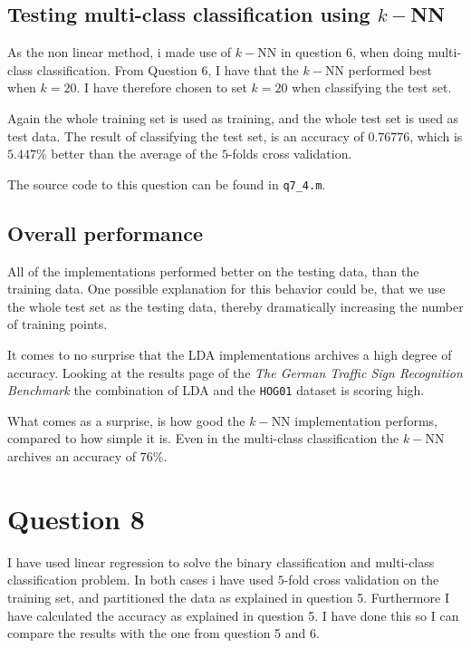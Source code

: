 \documentclass[10pt]{article}
\begin{document}

\subsection*{Testing multi-class classification using $k-$NN} %
\label{sub:testing_multi_class_classification_using_knn}
As the non linear method, i made use of $k-$NN in question 6, when doing multi-class classification. From Question 6, I have that the $k-$NN performed best when $k=20$. I have therefore chosen to set $k=20$ when classifying the test set. 

Again the whole training set is used as training, and the whole test set is used as test data. The result of classifying the test set, is an accuracy of $0.76776$, which is $5.447\%$ better than the average of the $5$-folds cross validation.  

The source code to this question can be found in \texttt{q7\_4.m}.

\subsection*{Overall performance} %
\label{sub:overall_performance}

All of the implementations performed better on the testing data, than the training data. One possible explanation for this behavior could be, that we use the whole test set as the testing data, thereby dramatically increasing the number of training points.

It comes to no surprise that the LDA implementations archives a high degree of accuracy. Looking at the results page of the \emph{The German Traffic Sign Recognition Benchmark}\cite{resultsURL} the combination of LDA and the \texttt{HOG01} dataset is scoring high.

What comes as a surprise, is how good the $k-$NN implementation performs, compared to how simple it is. Even in the multi-class classification the $k-$NN archives an accuracy of $76\%$.


\section*{Question 8} %
\label{sec:question_8}

I have used linear regression to solve the binary classification and multi-class classification problem. In both cases i have used $5$-fold cross validation on the training set, and partitioned the data as explained in question 5. Furthermore I have calculated the accuracy as explained in question 5. I have done this so I can compare the results with the one from question 5 and 6.
\end{document}
